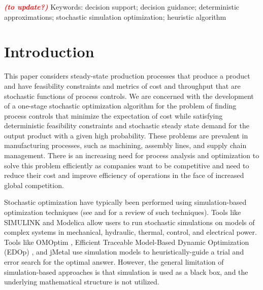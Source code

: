 \documentclass[a4paper, 12pt]{article} %
\newcommand\mycomment[1]{\textcolor{red}{\textbf{\textit{(#1)}}}}
\begin{document}
{\small \mycomment{to update?} Keywords: decision support;
	decision guidance;
	deterministic approximations;
	stochastic simulation optimization;
	heuristic algorithm } %

\vspace{5pt} %

\section{Introduction}

This paper considers steady-state production processes that produce a product and have feasibility constraints and metrics of cost and throughput that are stochastic functions of process controls. 
We are concerned with the development of a one-stage stochastic optimization algorithm for the problem of finding process controls that minimize the expectation of cost while satisfying deterministic feasibility constraints and stochastic steady state demand for the output product with a given high probability.
These problems are prevalent in manufacturing processes, such as machining, assembly lines, and supply chain management.
There is an increasing need for process analysis and optimization to solve this problem efficiently as companies want to be competitive and need to reduce their cost and improve efficiency of operations in the face of increased global competition. 


Stochastic optimization have typically been performed using simulation-based optimization techniques (see \cite{Amaran2016} and \cite{Nguyen2014} for a review of such techniques). 
Tools like SIMULINK \cite{Dabney:2001:MS:557989} and Modelica \cite{elmqvist1998modelica,Provan2012modelica} allow users to run stochastic simulations on models of complex systems in mechanical, hydraulic, thermal, control, and electrical power.
Tools like OMOptim \cite{OMOptim}, Efficient Traceable Model-Based Dynamic Optimization (EDOp) \cite{EDOp}, and jMetal \cite{jMetal} use simulation models to heuristically-guide a trial and error search for the optimal answer. 
However, the general limitation of simulation-based approaches is that simulation is used as a black box, and the underlying mathematical structure is not utilized. 
\end{document}

